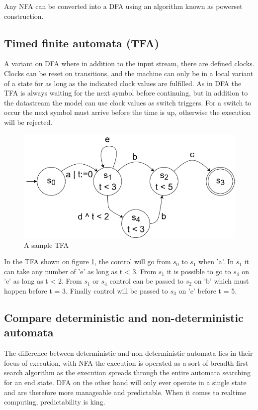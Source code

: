 Any NFA can be converted into a DFA using an algorithm known as powerset construction.

\subsection{Timed finite automata (TFA)}
A variant on DFA where in addition to the input stream, there are defined clocks. Clocks can be reset on transitions, and the machine can only be in a local variant of a state for as long as the indicated clock values are fulfilled. As in DFA the TFA is always waiting for the next symbol before continuing, but in addition to the datastream the model can use clock values as switch triggers. For a switch to occur the next symbol must arrive before the time is up, otherwise the execution will be rejected. 

\begin{figure}[h!]\label{}
    \centering
    \includegraphics[scale=0.5]{realTimeComputing/fig/TFA.png}
    \caption{A sample TFA}
    \label{fig:tfaSample}
\end{figure}

In the TFA shown on figure \ref{fig:tfaSample}, the control will go from $s_0$ to $s_1$ when 'a'. In $s_1$ it can take any number of 'e' as long as t < 3. From $s_1$ it is possible to go to $s_4$ on 'e' as long as t < 2. From $s_1$ or $s_4$ control can be passed to $s_2$ on 'b' which must happen before t = 3. Finally control will be passed to $s_3$ on 'c' before t = 5.

\subsection{Compare deterministic and non-deterministic automata}
The difference between deterministic and non-deterministic automata lies in their focus of execution, with NFA the execution is operated as a sort of breadth first search algorithm as the execution spreads through the entire automata searching for an end state. DFA on the other hand will only ever operate in a single state and are therefore more manageable and predictable. When it comes to realtime computing, predictability is king.

